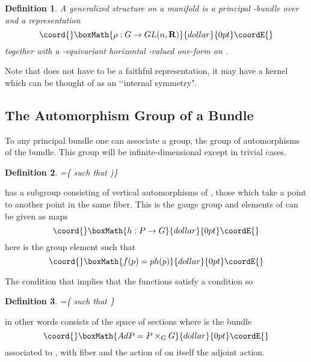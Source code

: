 \documentclass[a4paper,a4paper]{article}
\newtheorem{define}{Definition}
\theoremstyle{conjecture}
\begin{document}
\begin{define}
A generalized \coordHE{} structure on a manifold \coordHE{} is a principal \coordHE{}-bundle \coordHE{} over \coordHE{} and a
representation 
$$\coord{}\boxMath{\rho:G\rightarrow GL(n,\mathbf R)}{dollar}{0pt}\coordE{}$$
 together with a
\coordHE{}-equivariant horizontal \coordHE{}-valued one-form \myHighlight{$\theta$}\coordHE{} on \coordHE{}.
\end{define}

Note that \myHighlight{$\rho$}\coordHE{} does not have to be a faithful representation, it may have a kernel which can
be thought of as an \lq\lq internal symmetry".

\subsection{The Automorphism Group of a Bundle}

To any principal bundle \coordHE{} one can associate a group, the group \coordHE{} of automorphisms of the bundle.
This group will be infinite-dimensional except in trivial cases.

\begin{define}
\coordHE{}=\{\coordHE{} such that \coordHE{})\}
\end{define}

\coordHE{} has a subgroup consisting of vertical automorphisms of \coordHE{}, those which take a point \coordHE{} to another point
in the same fiber. This is the gauge group \coordHE{} and elements of \coordHE{} can be given as maps
$$\coord{}\boxMath{h: P\rightarrow G}{dollar}{0pt}\coordE{}$$
here \coordHE{} is the group element such that
$$\coord{}\boxMath{f(p)=ph(p)}{dollar}{0pt}\coordE{}$$

The condition that \coordHE{} implies that the functions \coordHE{}
satisfy a condition \coordHE{} so
\begin{define}
\coordHE{}=\{\coordHE{} such that \coordHE{}\}
\end{define}
in other words \coordHE{} consists of the space of sections \coordHE{} where \coordHE{} is the bundle
$$\coord{}\boxMath{Ad P=P\times_G G}{dollar}{0pt}\coordE{}$$
associated to \coordHE{}, with fiber \coordHE{} and the action of \coordHE{} on itself the adjoint action.
\end{document}
